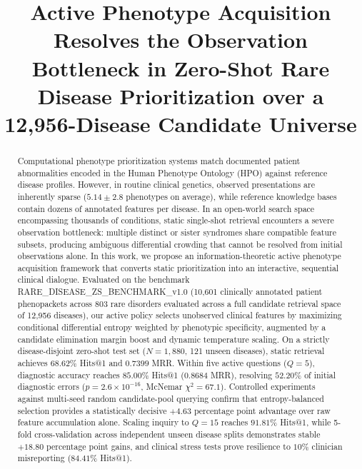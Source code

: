 \documentclass[conference]{IEEEtran}
\begin{document}
\title{Active Phenotype Acquisition Resolves the Observation Bottleneck in Zero-Shot Rare Disease Prioritization over a 12,956-Disease Candidate Universe}

\author{
}

\maketitle

\begin{abstract}
Computational phenotype prioritization systems match documented patient abnormalities encoded in the Human Phenotype Ontology (HPO) against reference disease profiles. However, in routine clinical genetics, observed presentations are inherently sparse ($5.14 \pm 2.8$ phenotypes on average), while reference knowledge bases contain dozens of annotated features per disease. In an open-world search space encompassing thousands of conditions, static single-shot retrieval encounters a severe observation bottleneck: multiple distinct or sister syndromes share compatible feature subsets, producing ambiguous differential crowding that cannot be resolved from initial observations alone. In this work, we propose an information-theoretic active phenotype acquisition framework that converts static prioritization into an interactive, sequential clinical dialogue. Evaluated on the benchmark RARE\_DISEASE\_ZS\_BENCHMARK\_v1.0 (10,601 clinically annotated patient phenopackets across 803 rare disorders evaluated across a full candidate retrieval space of 12,956 diseases), our active policy selects unobserved clinical features by maximizing conditional differential entropy weighted by phenotypic specificity, augmented by a candidate elimination margin boost and dynamic temperature scaling. On a strictly disease-disjoint zero-shot test set ($N=1,880$, 121 unseen diseases), static retrieval achieves $68.62\%$ Hits@1 and $0.7399$ MRR. Within five active questions ($Q=5$), diagnostic accuracy reaches $85.00\%$ Hits@1 ($0.8684$ MRR), resolving $52.20\%$ of initial diagnostic errors ($p = 2.6 \times 10^{-16}$, McNemar $\chi^2 = 67.1$). Controlled experiments against multi-seed random candidate-pool querying confirm that entropy-balanced selection provides a statistically decisive $+4.63$ percentage point advantage over raw feature accumulation alone. Scaling inquiry to $Q=15$ reaches $91.81\%$ Hits@1, while 5-fold cross-validation across independent unseen disease splits demonstrates stable $+18.80$ percentage point gains, and clinical stress tests prove resilience to $10\%$ clinician misreporting ($84.41\%$ Hits@1).
\end{abstract}
\end{document}
